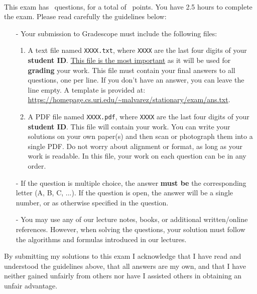 \documentclass[12pt,addpoints]{exam}
\begin{document}
~{\large
    \vspace{.5in}

    This exam has \numquestions\ questions, for a total of \numpoints\ points.  You have 2.5 hours to complete the exam.  Please read carefully the guidelines below:

    \begin{itemize}
        \item[-] Your submission to Gradescope must include the following files:
        \begin{enumerate}
            \item A text file named \verb|XXXX.txt|, where \verb|XXXX| are the last four digits of your {\bf student ID}.  \underline{This file is the most important} as it will be used for {\bf grading} your work.  This file must contain your final answers to all questions, one per line.  If you don't have an answer, you can leave the line empty.  A template is provided at: \url{https://homepage.cs.uri.edu/~malvarez/stationary/exam/ans.txt}.
            \item A PDF file named \verb|XXXX.pdf|, where \verb|XXXX| are the last four digits of your {\bf student ID}.  This file will contain your work.  You can write your solutions on your own paper(s) and then scan or photograph them into a single PDF.  Do not worry about alignment or format, as long as your work is readable. In this file, your work on each question can be in any order.
        \end{enumerate}
        \item[-] If the question is multiple choice, the answer {\bf must be} the corresponding letter (A, B, C, ...).  If the question is open, the answer will be a single number, or as otherwise specified in the question.
        \item[-] You may use any of our lecture notes, books, or additional written/online references.  However, when solving the questions, your solution must follow the algorithms and formulas introduced in our lectures.
    \end{itemize}
    
    By submitting my solutions to this exam I acknowledge that I have read and understood the guidelines above, that all answers are my own, and that I have neither gained unfairly from others nor have I assisted others in obtaining an unfair advantage.
}

\pagebreak
\end{document}
